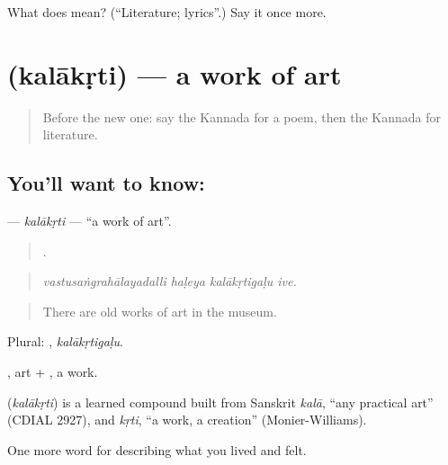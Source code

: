 \begin{tcolorbox}[breakable,colback=teal!4,colframe=teal!35!black,title={Before you move on}]
What does  mean? (\textquotedblleft{}Literature; lyrics\textquotedblright{}.) Say it once more.
\end{tcolorbox}
\section[\texorpdfstring{\kn{ಕಲಾಕೃತಿ} (kalākṛti)}{ಕಲಾಕೃತಿ (kalākṛti)}]{ (kalākṛti) — a work of art}

\label{lesson:KA-C537-kalakrti}



\begin{quote}
Before the new one: say the Kannada for a poem, then the Kannada for literature.
\end{quote}

\subsection*{You'll want to know: }
\textbf{} — \emph{kalākṛti} — \textquotedblleft{}a work of art\textquotedblright{}.

\begin{quote}
   .
\end{quote}

\begin{quote}
\emph{vastusaṅgrahālayadalli haḷeya kalākṛtigaḷu ive.}
\end{quote}

\begin{quote}
There are old works of art in the museum.
\end{quote}

Plural: , \emph{kalākṛtigaḷu}.

, art + , a work.

\begin{cousinweb}
\textbf{} (\emph{kalākṛti}) is a learned compound built from Sanskrit \emph{kalā}, \textquotedblleft{}any practical art\textquotedblright{} (CDIAL 2927), and \emph{kṛti}, \textquotedblleft{}a work, a creation\textquotedblright{} (Monier-Williams).
\end{cousinweb}

\begin{grammarlens}[title={What you've built}]
One more word for describing what you lived and felt.
\end{grammarlens}

